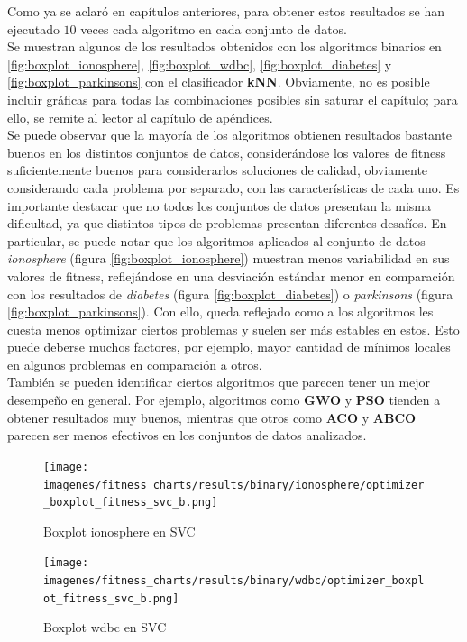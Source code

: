 Como ya se aclaró en capítulos anteriores, para obtener estos resultados se han ejecutado $10$ veces cada algoritmo en cada conjunto de datos.\\[6pt]
Se muestran algunos de los resultados obtenidos con los algoritmos binarios en \ref{fig:boxplot_ionosphere}, \ref{fig:boxplot_wdbc}, \ref{fig:boxplot_diabetes} y \ref{fig:boxplot_parkinsons} con el clasificador \textbf{kNN}. Obviamente, no es posible incluir gráficas para todas las combinaciones posibles sin saturar el capítulo; para ello, se remite al lector al capítulo de apéndices.\\[6pt]
Se puede observar que la mayoría de los algoritmos obtienen resultados bastante buenos en los distintos conjuntos de datos, considerándose los valores de fitness suficientemente buenos para considerarlos soluciones de calidad, obviamente considerando cada problema por separado, con las características de cada uno. Es importante destacar que no todos los conjuntos de datos presentan la misma dificultad, ya que distintos tipos de problemas presentan diferentes desafíos. En particular, se puede notar que los algoritmos aplicados al conjunto de datos \textit{ionosphere} (figura \ref{fig:boxplot_ionosphere}) muestran menos variabilidad en sus valores de fitness, reflejándose en una desviación estándar menor en comparación con los resultados de \textit{diabetes} (figura \ref{fig:boxplot_diabetes}) o \textit{parkinsons} (figura \ref{fig:boxplot_parkinsons}). Con ello, queda reflejado como a los algoritmos les cuesta menos optimizar ciertos problemas y suelen ser más estables en estos. Esto puede deberse muchos factores, por ejemplo, mayor cantidad de mínimos locales en algunos problemas en comparación a otros.\\[6pt]
También se pueden identificar ciertos algoritmos que parecen tener un mejor desempeño en general. Por ejemplo, algoritmos como \textbf{GWO} y \textbf{PSO} tienden a obtener resultados muy buenos, mientras que otros como \textbf{ACO} y \textbf{ABCO} parecen ser menos efectivos en los conjuntos de datos analizados.

\begin{figure}[htb]
    \centering
    \texttt{[image: imagenes/fitness\_charts/results/binary/ionosphere/optimizer\_boxplot\_fitness\_svc\_b.png]}
    \caption{Boxplot ionosphere en SVC}
    \label{fig:boxplot_ionospheresvc}
\end{figure}

\begin{figure}[htb]
    \centering
    \texttt{[image: imagenes/fitness\_charts/results/binary/wdbc/optimizer\_boxplot\_fitness\_svc\_b.png]}
    \caption{Boxplot wdbc en SVC}
    \label{fig:boxplot_wdbcsvc}
\end{figure}

